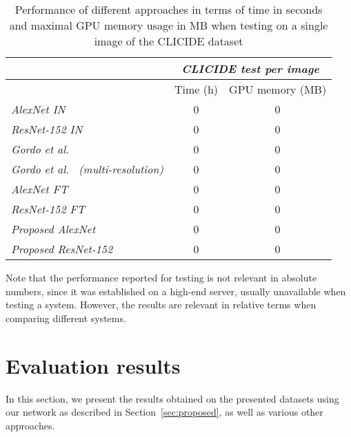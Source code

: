 \begin{table}
\begin{tabular}{|l|c|c|}
\hline & \multicolumn{2}{c|}{\emph{CLICIDE test per image}}\\
\hline & Time (h) & GPU memory (MB)\\
\hline \emph{AlexNet IN} & 0 & 0\\ %
\hline \emph{ResNet-152 IN} & 0 & 0\\
\hline \emph{Gordo et al.~\cite{gordo_deep_2016}} & 0 & 0\\
\hline \emph{Gordo et al.~\cite{gordo_deep_2016} (multi-resolution)}
& 0 & 0\\
\hline \emph{AlexNet FT} & 0 & 0\\ %
\hline \emph{ResNet-152 FT} & 0 & 0\\
\hline \emph{Proposed AlexNet} & 0 & 0\\ %
\hline \emph{Proposed ResNet-152} & 0 & 0\\
\hline
\end{tabular}
\caption{Performance of different approaches in terms of time in seconds and
maximal GPU memory usage in MB when testing on a single image
of the CLICIDE dataset\label{tab:perftest}}
\end{table}

Note that the performance reported for testing is not relevant in absolute numbers,
since it was established on a high-end server, usually unavailable when testing
a system. However, the results are relevant in relative terms when comparing
different systems.



\section{Evaluation results}\label{sec:evalresults}
In this section, we present the results obtained on the presented datasets
using our network as described in Section~\ref{sec:proposed}, as well
as various other approaches.

